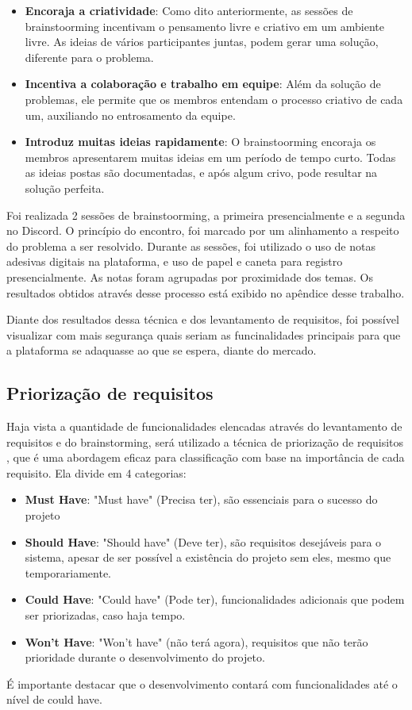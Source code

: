 \begin{itemize}
    \item \textbf{Encoraja a criatividade}: Como dito anteriormente, as sessões de brainstoorming incentivam o pensamento livre e criativo em um ambiente livre. As ideias de vários participantes juntas, podem gerar uma solução, diferente para o problema.
    \item \textbf{Incentiva a colaboração e trabalho em equipe}: Além da solução de problemas, ele permite que os membros entendam o processo criativo de cada um, auxiliando no entrosamento da equipe.
    \item \textbf{Introduz muitas ideias rapidamente}: O brainstoorming encoraja os membros apresentarem muitas ideias em um período de tempo curto. Todas as ideias postas são documentadas, e após algum crivo, pode resultar na solução perfeita.
\end{itemize}

Foi realizada 2 sessões de brainstoorming, a primeira presencialmente e a segunda no Discord. O princípio do encontro, foi marcado por um alinhamento a respeito do problema a ser resolvido. Durante as sessões, foi utilizado o uso de notas adesivas digitais na plataforma, e uso de papel e caneta para registro presencialmente. As notas foram agrupadas por proximidade dos temas. Os resultados obtidos através desse processo está exibido no apêndice desse trabalho. 

Diante dos resultados dessa técnica e dos levantamento de requisitos, foi possível visualizar com mais segurança quais seriam as funcinalidades principais para que a plataforma se adaquasse ao que se espera, diante do mercado.


\subsection{Priorização de requisitos}

Haja vista a quantidade de funcionalidades elencadas através do levantamento de requisitos e do brainstorming, será utilizado a técnica de priorização de requisitos \cite{MoSCoW}, que é uma abordagem eficaz para classificação com base na importância de cada requisito. Ela divide em 4 categorias:

\begin{itemize}
    \item \textbf{Must Have}: "Must have" (Precisa
    ter), são essenciais para o sucesso do projeto
    \item \textbf{Should Have}: "Should have" (Deve ter), são requisitos desejáveis para o sistema, apesar de ser possível a existência do projeto sem eles, mesmo que temporariamente.
    \item \textbf{Could Have}: "Could have" (Pode ter), funcionalidades adicionais que podem ser priorizadas, caso haja tempo.
    \item \textbf{Won’t Have}: "Won’t have" (não terá agora), requisitos que não terão prioridade durante o desenvolvimento do projeto.
\end{itemize}

É importante destacar que o desenvolvimento contará com funcionalidades até o nível de could have.  
